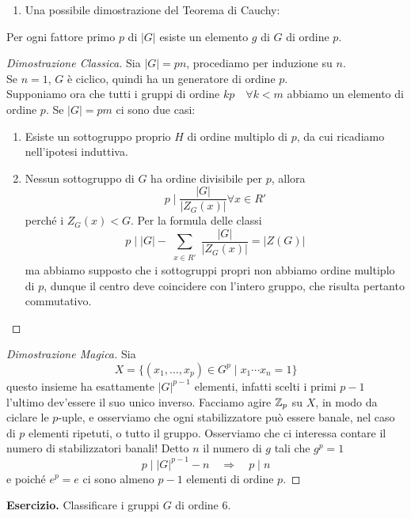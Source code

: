 \begin{multicols}{2}
\begin{enumerate}
	\item Una possibile dimostrazione del Teorema di Cauchy:
\end{enumerate}

\begin{theorem}[di Cauchy] \label{cauchy}
	Per ogni fattore primo $ p $ di $ |G| $ esiste un elemento $ g $ di $ G $ di ordine $ p $.
\end{theorem}
\begin{proof}[Dimostrazione Classica]
	Sia $ |G|= pn $, procediamo per induzione su $ n $. \\
	
	Se $ n = 1 $, $ G $ è ciclico, quindi ha un generatore di ordine $ p $. \\
	
	Supponiamo ora che tutti i gruppi di ordine $ kp  \quad\forall k < m$ abbiamo un elemento di ordine $ p $. Se $ |G|=pm $ ci sono due casi:
	\begin{enumerate}
		\item Esiste un sottogruppo proprio $ H $ di ordine multiplo di $ p $, da cui ricadiamo nell'ipotesi induttiva.
		\item Nessun sottogruppo di $ G $ ha ordine divisibile per $ p $, allora
		\[ p \mid \frac{|G|}{|Z_G(x)|} \forall x \in R' \] perché i $ Z_G(x) < G $. Per la formula delle classi
		\[ p \mid |G| - \sum_{\substack{x \in R'}} \frac{|G|}{|Z_G(x)|} = |Z(G)| \]
		ma abbiamo supposto che i sottogruppi propri non abbiamo ordine multiplo di $ p $, dunque il centro deve coincidere con l'intero gruppo, che risulta pertanto commutativo.
	\end{enumerate}
\end{proof}
\begin{proof}[Dimostrazione Magica]
	Sia $$ X = \{(x_1, \dots, x_p) \in G^p \mid x_1\cdots x_n = 1 \} $$ questo insieme ha esattamente $ |G|^{p-1} $ elementi, infatti scelti i primi $ p-1 $ l'ultimo dev'essere il suo unico inverso.
	Facciamo agire $ \mathbb{Z}_p $ su $ X $, in modo da ciclare le $ p $-uple, e osserviamo che ogni stabilizzatore può essere banale, nel caso di $ p $ elementi ripetuti, o tutto il gruppo. Osserviamo che ci interessa contare il numero di stabilizzatori banali!
	Detto $ n $ il numero di $ g $ tali che $ g^p = 1 $ \[ p \mid |G|^{p-1} - n \quad\Rightarrow\quad p \mid n \] e poiché $ e^p = e $ ci sono almeno $ p - 1 $ elementi di ordine $ p $.
\end{proof}



\textbf{Esercizio.} Classificare i gruppi $ G $ di ordine $ 6 $.


\end{multicols}
